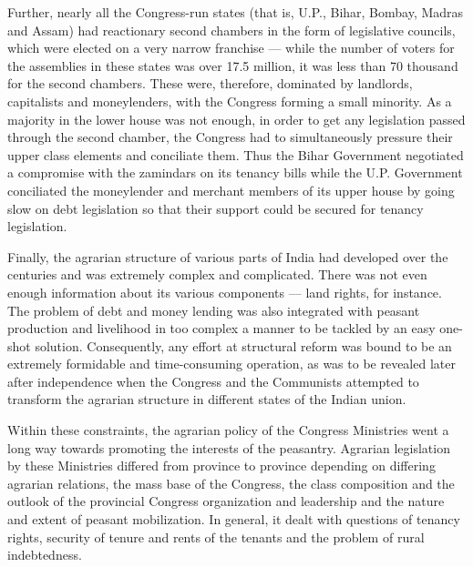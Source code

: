 \begin{multicols}{2}
Further, nearly all the Congress-run states (that is, U.P., Bihar, Bombay, Madras and Assam) had reactionary second chambers in the form of legislative councils, which were elected on a very narrow franchise --- while the number of voters for the assemblies in these states was over 17.5 million, it was less than 70 thousand for the second chambers. These were, therefore, dominated by landlords, capitalists and moneylenders, with the Congress forming a small minority. As a majority in the lower house was not enough, in order to get any legislation passed through the second chamber, the Congress had to simultaneously pressure their upper class elements and conciliate them. Thus the Bihar Government negotiated a compromise with the zamindars on its tenancy bills while the U.P. Government conciliated the moneylender and merchant members of its upper house by going slow on debt legislation so that their support could be secured for tenancy legislation.

Finally, the agrarian structure of various parts of India had developed over the centuries and was extremely complex and complicated. There was not even enough information about its various components --- land rights, for instance. The problem of debt and money lending was also integrated with peasant production and livelihood in too complex a manner to be tackled by an easy one-shot solution. Consequently, any effort at structural reform was bound to be an extremely formidable and time-consuming operation, as was to be revealed later after independence when the Congress and the Communists attempted to transform the agrarian structure in different states of the Indian union.

Within these constraints, the agrarian policy of the Congress Ministries went a long way towards promoting the interests of the peasantry. Agrarian legislation by these Ministries differed from province to province depending on differing agrarian relations, the mass base of the Congress, the class composition and the outlook of the provincial Congress organization and leadership and the nature and extent of peasant mobilization. In general, it dealt with questions of tenancy rights, security of tenure and rents of the tenants and the problem of rural indebtedness.


\end{multicols}
